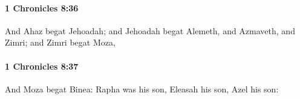 		\paragraph{1 Chronicles 8:36} %
			\label{1CHRONICLES-8-36}

			And Ahaz begat Jehoadah; and Jehoadah begat Alemeth, and Azmaveth, and Zimri; and Zimri begat Moza,


		\paragraph{1 Chronicles 8:37} %
			\label{1CHRONICLES-8-37}

			And Moza begat Binea: Rapha was his son, Eleasah his son, Azel his son:


